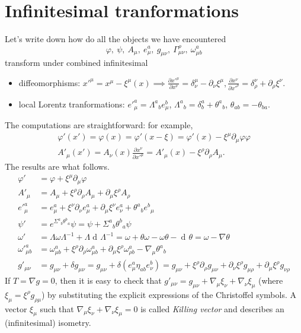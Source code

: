\documentclass[a4paper,12pt]{book}
\newcommand{\dd}{\mathop{\mathrm{d}\!}{}}
\theoremstyle{definition}
\theoremstyle{remark}
\begin{document}
\section{Infinitesimal tranformations}
Let's write down how do all the objects we have encountered
\[\varphi,\ \psi,\ A_\mu,\ e^a_\mu,\ g_{\mu\nu},\ \Gamma^\rho_{\mu\nu},\ \omega^a_{\mu b}\]
transform under combined infinitesimal
\begin{itemize}
\item diffeomorphisms: $x'^\mu=x^\mu-\xi^\mu(x)\implies\frac{\partial x'^\mu}{\partial x^\nu}=\delta^\mu_\nu-\partial_\nu\xi^\mu,\frac{\partial x^\nu}{\partial x'^\rho}=\delta^\nu_\rho+\partial_\rho\xi^\nu$.
\item local Lorentz tranformations: $e'^a_\mu=\Lambda^a{}_be^b_\mu$, $\Lambda^a{}_b=\delta^a_b+\theta^a{}_b$, $\theta_{ab}=-\theta_{ba}$.
\end{itemize}
The computations are straightforward: for example,
\begin{gather*}
\varphi'(x')=\varphi(x)=\varphi'(x-\xi)=\varphi'(x)-\xi^\mu\partial_\mu\varphi\varphi\\
A'_\mu(x')=A_\nu(x)\frac{\partial x^\nu}{\partial x'^\mu}=A'_\mu(x)-\xi^\rho\partial_\rho A_\mu.
\end{gather*}
The results are what follows.
\begin{align*}
\varphi'&=\varphi+\xi^\mu\partial_\mu\varphi\\
A'_\mu&=A_\mu+\xi^\rho\partial_\rho A_\mu+\partial_\mu\xi^\rho A_\rho\\
e'^a_\mu&=e^a_\mu+\xi^\nu\partial_\nu e^a_\mu+\partial_\mu\xi^\nu e^a_\nu+\theta^a{}_b e^b{}_\mu\\
\psi'&=e^{\Sigma^a{}_b\theta^b{}_a}\psi=\psi+\Sigma^a{}_b\theta^b{}_a\psi\\
\omega'&=\Lambda\omega\Lambda^{-1}+\Lambda\dd\Lambda^{-1}=\omega+\theta\omega-\omega\theta-\dd\theta=\omega-\nabla\theta\\
\omega'^a_{\mu b}&=\omega^a_{\mu b}+\xi^\rho\partial_\rho\omega^a_{\mu b}+\partial_\mu\xi^\rho\omega^a_{\rho b}-\nabla_\mu\theta^a{}_b\\
g'_{\mu\nu}&=g_{\mu\nu}+\delta g_{\mu\nu}=g_{\mu\nu}+\delta(e^a_\mu\eta_{ab}e^b_\nu)=g_{\mu\nu}+\xi^\rho\partial_\rho g_{\mu\nu}+\partial_\nu\xi^\rho g_{\mu\rho}+\partial_\mu\xi^\rho g_{\nu\rho}
\end{align*}
If $T=\nabla g=0$, then it is easy to check that $g'_{\mu\nu}=g_{\mu\nu}+\nabla_\mu\xi_\nu+\nabla_\nu\xi_\mu$ (where $\xi_\mu=\xi^\rho g_{\rho\mu}$) by substituting the explicit expressions of the Christoffel symbols. A vector $\xi_\mu$ such that $\nabla_\mu\xi_\nu+\nabla_\nu\xi_\mu=0$ is called \emph{Killing vector} and describes an (infinitesimal) isometry.
\end{document}
